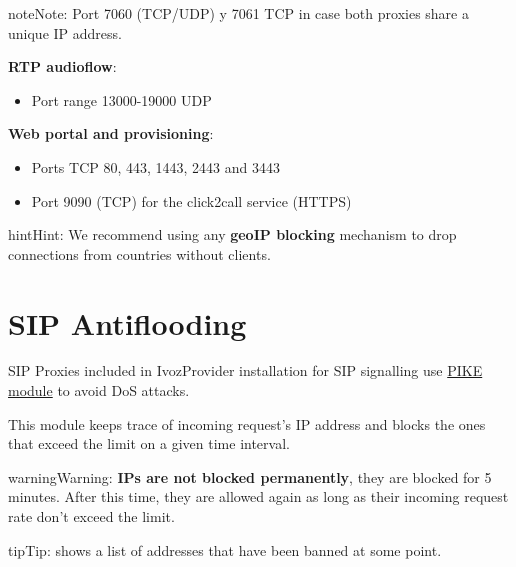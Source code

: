 \documentclass[letterpaper,10pt,english]{sphinxmanual}
\begin{document}
\begin{notice}{note}{Note:}
Port 7060 (TCP/UDP) y 7061 TCP in case both proxies share a unique IP address.
\end{notice}

\textbf{RTP audioflow}:
\begin{itemize}
\item {} 
Port range 13000-19000 UDP

\end{itemize}

\textbf{Web portal and provisioning}:
\begin{itemize}
\item {} 
Ports TCP 80, 443, 1443, 2443 and 3443

\item {} 
Port 9090 (TCP) for the click2call service (HTTPS)

\end{itemize}

\begin{notice}{hint}{Hint:}
We recommend using any \textbf{geoIP blocking} mechanism to drop connections from
countries without clients.
\end{notice}


\section{SIP Antiflooding}
\label{security_and_maintenance/security/antiflooding::doc}\label{security_and_maintenance/security/antiflooding:sip-antiflooding}\label{security_and_maintenance/security/antiflooding:id1}
SIP Proxies included in IvozProvider installation for SIP signalling use
\href{http://kamailio.org/docs/modules/5.1.x/modules/pike.html}{PIKE module} to avoid DoS attacks.

This module keeps trace of incoming request's IP address and blocks the ones that exceed the limit on a given time
interval.

\begin{notice}{warning}{Warning:}
\textbf{IPs are not blocked permanently}, they are blocked for 5 minutes. After this time, they are allowed again
as long as their incoming request rate don't exceed the limit.
\end{notice}

\begin{notice}{tip}{Tip:}
{\hyperref[administration_portal/platform/antiflood_banned_ips:antiflood\string-banned\string-ips]{}} shows a list of addresses that have been banned at some point.
\end{notice}
\end{document}
